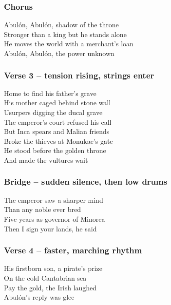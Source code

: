 \subsubsection{Chorus}\label{chorus-23}

Abulón, Abulón, shadow of the throne\\
Stronger than a king but he stands alone\\
He moves the world with a merchant's loan\\
Abulón, Abulón, the power unknown

\subsubsection{Verse 3 -- tension rising, strings
enter}\label{verse-3-tension-rising-strings-enter}

Home to find his father's grave\\
His mother caged behind stone wall\\
Usurpers digging the ducal grave\\
The emperor's court refused his call\\
But Inca spears and Malian friends\\
Broke the thieves at Monukae's gate\\
He stood before the golden throne\\
And made the vultures wait

\subsubsection{Bridge -- sudden silence, then low
drums}\label{bridge-sudden-silence-then-low-drums}

The emperor saw a sharper mind\\
Than any noble ever bred\\
Five years as governor of Minorca\\
Then I sign your lands, he said

\subsubsection{Verse 4 -- faster, marching
rhythm}\label{verse-4-faster-marching-rhythm}

His firstborn son, a pirate's prize\\
On the cold Cantabrian sea\\
Pay the gold, the Irish laughed\\
Abulón's reply was glee

